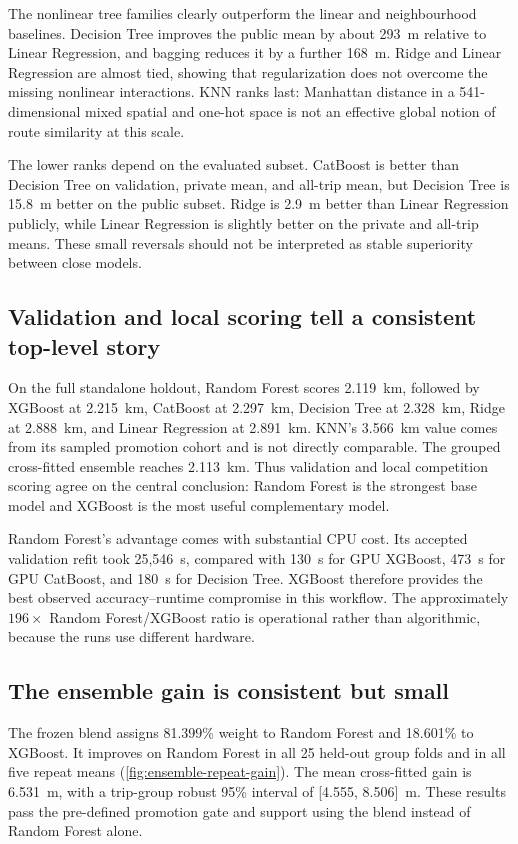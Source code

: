 The nonlinear tree families clearly outperform the linear and neighbourhood baselines.  Decision Tree improves the public mean by about 293~m relative to Linear Regression, and bagging reduces it by a further 168~m.  Ridge and Linear Regression are almost tied, showing that regularization does not overcome the missing nonlinear interactions.  KNN ranks last: Manhattan distance in a 541-dimensional mixed spatial and one-hot space is not an effective global notion of route similarity at this scale.

The lower ranks depend on the evaluated subset.  CatBoost is better than Decision Tree on validation, private mean, and all-trip mean, but Decision Tree is 15.8~m better on the public subset.  Ridge is 2.9~m better than Linear Regression publicly, while Linear Regression is slightly better on the private and all-trip means.  These small reversals should not be interpreted as stable superiority between close models.

\subsection{Validation and local scoring tell a consistent top-level story}

On the full standalone holdout, Random Forest scores 2.119~km, followed by XGBoost at 2.215~km, CatBoost at 2.297~km, Decision Tree at 2.328~km, Ridge at 2.888~km, and Linear Regression at 2.891~km.  KNN's 3.566~km value comes from its sampled promotion cohort and is not directly comparable.  The grouped cross-fitted ensemble reaches 2.113~km.  Thus validation and local competition scoring agree on the central conclusion: Random Forest is the strongest base model and XGBoost is the most useful complementary model.

Random Forest's advantage comes with substantial CPU cost.  Its accepted validation refit took 25,546~s, compared with 130~s for GPU XGBoost, 473~s for GPU CatBoost, and 180~s for Decision Tree.  XGBoost therefore provides the best observed accuracy--runtime compromise in this workflow.  The approximately $196\times$ Random Forest/XGBoost ratio is operational rather than algorithmic, because the runs use different hardware.

\subsection{The ensemble gain is consistent but small}

The frozen blend assigns 81.399\% weight to Random Forest and 18.601\% to XGBoost.  It improves on Random Forest in all 25 held-out group folds and in all five repeat means (\cref{fig:ensemble-repeat-gain}).  The mean cross-fitted gain is 6.531~m, with a trip-group robust 95\% interval of [4.555, 8.506]~m.  These results pass the pre-defined promotion gate and support using the blend instead of Random Forest alone.

